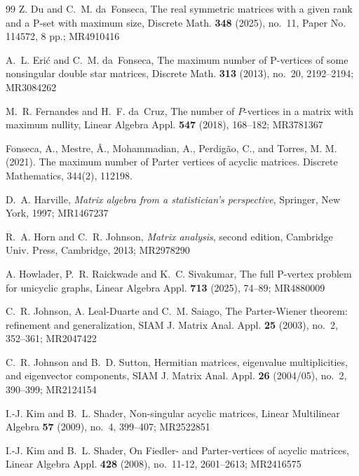 \documentclass[12pt,reqno]{amsart}
\theoremstyle{definition}
\numberwithin{equation}{subsection}
\numberwithin{equation}{section}
\begin{document}
\begin{thebibliography}{99}
 Z. Du and C.~M. da~Fonseca, The real symmetric matrices with a given rank and a P-set with maximum size, Discrete Math. {\bf 348} (2025), no.~11, Paper No. 114572, 8 pp.; MR4910416

 A.~L. Eri\'c{} and C.~M. da~Fonseca, The maximum number of P-vertices of some nonsingular double star matrices, Discrete Math. {\bf 313} (2013), no.~20, 2192--2194; MR3084262

 M.~R. Fernandes and H.~F. da~Cruz, The number of $P$-vertices in a matrix with maximum nullity, Linear Algebra Appl. {\bf 547} (2018), 168--182; MR3781367

 Fonseca, A., Mestre, Â., Mohammadian, A., Perdigão, C., and Torres, M. M. (2021). The maximum number of Parter vertices of acyclic matrices. Discrete Mathematics, 344(2), 112198.



D.~A. Harville, {\it Matrix algebra from a statistician's perspective}, Springer, New York, 1997; MR1467237

 R.~A. Horn and C.~R. Johnson, {\it Matrix analysis}, second edition, 
Cambridge Univ. Press, Cambridge, 2013; MR2978290

 A. Howlader, P.~R. Raickwade and K.~C. Sivakumar, The full P-vertex problem for unicyclic graphs, Linear Algebra Appl. {\bf 713} (2025), 74--89; MR4880009

 C.~R. Johnson, A. Leal-Duarte and C.~M. Saiago, The Parter-Wiener theorem: refinement and generalization, SIAM J. Matrix Anal. Appl. {\bf 25} (2003), no.~2, 352--361; MR2047422

 C.~R. Johnson and B.~D. Sutton, Hermitian matrices, eigenvalue multiplicities, and eigenvector components, SIAM J. Matrix Anal. Appl. {\bf 26} (2004/05), no.~2, 390--399; MR2124154

 I.-J. Kim and B.~L. Shader, Non-singular acyclic matrices, Linear Multilinear Algebra {\bf 57} (2009), no.~4, 399--407; MR2522851

I.-J. Kim and B.~L. Shader, On Fiedler- and Parter-vertices of acyclic matrices, Linear Algebra Appl. {\bf 428} (2008), no.~11-12, 2601--2613; MR2416575



\end{thebibliography}
\end{document}
